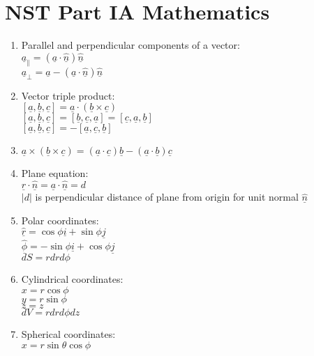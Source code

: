 \documentclass[fleqn]{article}
\author{Victor Zhao\\xz398@cam.ac.uk}
\begin{document}
\centering
\section*{NST Part IA Mathematics}
\MyAuthor

\begin{enumerate}
    \item Parallel and perpendicular components of a vector:\\
        $\underline{a}_\parallel=(\underline{a}\cdot\underline{\hat{n}})\underline{\hat{n}}$\\
        $\underline{a}_\perp=\underline{a}-(\underline{a}\cdot\underline{\hat{n}})\underline{\hat{n}}$
    \item Vector triple product:\\
        $[\underline{a},\underline{b},\underline{c}]=\underline{a}\cdot(\underline{b}\times\underline{c})$\\
        $[\underline{a},\underline{b},\underline{c}]=[\underline{b},\underline{c},\underline{a}]=[\underline{c},\underline{a},\underline{b}]$\\
        $[\underline{a},\underline{b},\underline{c}]=-[\underline{a},\underline{c},\underline{b}]$
    \item $\underline{a}\times(\underline{b}\times\underline{c})=(\underline{a}\cdot\underline{c})\underline{b}-(\underline{a}\cdot\underline{b})\underline{c}$
    \item Plane equation:\\
        $\underline{r}\cdot\underline{\hat{n}}=\underline{a}\cdot\underline{\hat{n}}=d$\\
        $|$$d$$|$ is perpendicular distance of plane from origin for unit normal $\underline{\hat{n}}$
    \item Polar coordinates:\\
        $\underline{\hat{r}}=\cos\phi\underline{i}+\sin\phi\underline{j}$\\
        $\underline{\hat{\phi}}=-\sin\phi\underline{i}+\cos\phi\underline{j}$\\
        $dS=rdrd\phi$
    \item Cylindrical coordinates:\\
        $x=r\cos\phi$\\
        $y=r\sin\phi$\\
        $z=z$\\
        $dV=rdrd\phi dz$
    \item Spherical coordinates:\\
        $x=r\sin\theta\cos\phi$\\

\end{enumerate}
\end{document}
